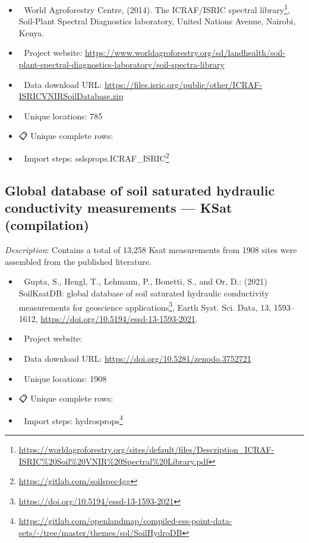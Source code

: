 \documentclass[
  graybox,natbib,nospthms]{svmono}
\providecommand{\tightlist}{%
  \setlength{\itemsep}{0pt}\setlength{\parskip}{0pt}}
\providecommand{\tightlist}{\setlength{\itemsep}{0pt}\setlength{\parskip}{0pt}}
\renewcommand{\href}[2]{#2 (\url{#1})}
\renewcommand{\href}[2]{#2\footnote{\url{#1}}}
\begin{document}
\begin{itemize}
\tightlist
\item
  📕 World Agroforestry Centre, (2014). \href{https://worldagroforestry.org/sites/default/files/Description_ICRAF-ISRIC\%20Soil\%20VNIR\%20Spectral\%20Library.pdf}{The ICRAF/ISRIC spectral library}, Soil-Plant Spectral Diagnostics laboratory, United
  Nations Avenue, Nairobi, Kenya.\\
\item
  🔗 Project website: \url{https://www.worldagroforestry.org/sd/landhealth/soil-plant-spectral-diagnostics-laboratory/soil-spectra-library}\\
\item
  📂 Data download URL: \url{https://files.isric.org/public/other/ICRAF-ISRICVNIRSoilDatabase.zip}\\
\item
  📍 Unique locations: 785\\
\item
  📋 Unique complete rows:\\
\item
  📝 Import steps: \href{https://gitlab.com/soilspec4gg}{sslsprops.ICRAF\_ISRIC}
\end{itemize}

\hypertarget{global-database-of-soil-saturated-hydraulic-conductivity-measurements-ksat-compilation}{%
\subsection{Global database of soil saturated hydraulic conductivity measurements --- KSat (compilation)}\label{global-database-of-soil-saturated-hydraulic-conductivity-measurements-ksat-compilation}}

\emph{Description}: Contains a total of 13,258 Ksat measurements from 1908 sites were assembled from the published literature.

\begin{itemize}
\tightlist
\item
  📕 Gupta, S., Hengl, T., Lehmann, P., Bonetti, S., and Or, D.: (2021) \href{https://doi.org/10.5194/essd-13-1593-2021}{SoilKsatDB: global database of soil saturated hydraulic conductivity measurements for geoscience applications}, Earth Syst. Sci. Data, 13, 1593--1612, \url{https://doi.org/10.5194/essd-13-1593-2021}.\\
\item
  🔗 Project website:\\
\item
  📂 Data download URL: \url{https://doi.org/10.5281/zenodo.3752721}\\
\item
  📍 Unique locations: 1908\\
\item
  📋 Unique complete rows:\\
\item
  📝 Import steps: \href{https://gitlab.com/openlandmap/compiled-ess-point-data-sets/-/tree/master/themes/sol/SoilHydroDB}{hydrosprops}
\end{itemize}
\end{document}
